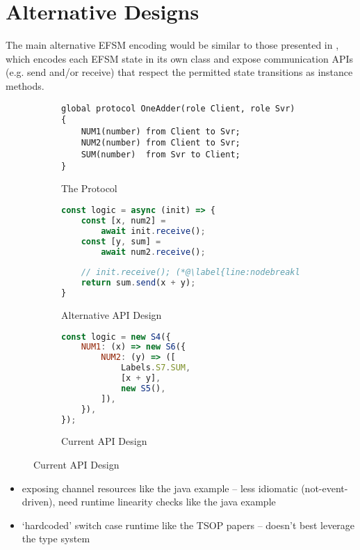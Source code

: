 \section{Alternative Designs}
\label{section:nodealt}

The main alternative EFSM encoding would be similar to those
presented in \cite{Hybrid2016}, which encodes
each EFSM state in its own class 
and expose communication APIs (e.g. send and/or receive) 
that respect the permitted state transitions as instance methods.

\begin{figure}[!h]
\centering
\begin{subfigure}{\textwidth}
\begin{lstlisting}[language=scribble]
global protocol OneAdder(role Client, role Svr) {
	NUM1(number) from Client to Svr;
	NUM2(number) from Client to Svr;
	SUM(number)  from Svr to Client;
}
\end{lstlisting}
\caption{The  Protocol}
\end{subfigure}
\begin{subfigure}{0.49\textwidth}
\begin{lstlisting}[language=javascript,tabsize=2]
const logic = async (init) => {
	const [x, num2] = 
		await init.receive();
 	const [y, sum] = 
 		await num2.receive();
 		
 	// init.receive(); (*@\label{line:nodebreaklinear}@*)
	return sum.send(x + y);
}
\end{lstlisting}
\caption{Alternative API Design}
\end{subfigure}
\hfill
\begin{subfigure}{0.49\textwidth}
\begin{lstlisting}[language=javascript,tabsize=2]
const logic = new S4({
	NUM1: (x) => new S6({
		NUM2: (y) => ([
			Labels.S7.SUM,
			[x + y],
			new S5(),
		]),
	}),
});

\end{lstlisting}
\caption{Current API Design}
\end{subfigure}
\end{figure}

\begin{itemize}
\item exposing channel resources like the java example -- less idiomatic (not-event-driven), need runtime linearity checks like the java example
\item `hardcoded' switch case runtime like the TSOP papers -- doesn't best leverage the type system
\end{itemize}